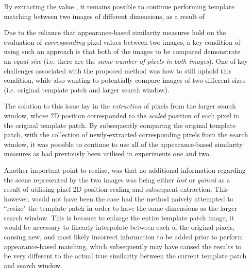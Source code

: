 By extracting the value , it remains possible to continue performing template matching between two images of different dimensions, as a result of

Due to the reliance that appearance-based similarity measures hold on the evaluation of \textit{corresponding} pixel values between two images, a key condition of using such an approach is that both of the images to be compared demonstrate an \textit{equal size} (i.e. there are the \textit{same number of pixels in both images}). One of key challenges associated with the proposed method was how to still uphold this condition, while also wanting to potentially compare images of two different sizes (i.e. original template patch and larger search window). 

The solution to this issue lay in the \textit{extraction} of pixels from the larger search window, whose 2D position corresponded to the \textit{scaled} position of each pixel in the original template patch. By subsequently comparing the original template patch, with the collection of newly-extracted corresponding pixels from the search window, it was possible to continue to use all of the appearance-based similarity measures as had previously been utilised in experiments one and two. 

Another important point to realise, was that no additional information regarding the scene represented by the two images was being either \textit{lost} or \textit{gained} as a result of utilising pixel 2D position scaling and subsequent extraction. This however, would not have been the case had the method naively attempted to ``resize" the template patch in order to have the same dimensions as the larger search window. This is because to enlarge the entire template patch image, it would be necessary to linearly interpolate between each of the original pixels, causing new, and most likely incorrect information to be added prior to perform appearance-based matching, which subsequently may have caused the results to be very different to the actual true similarity between the current template patch and search window.